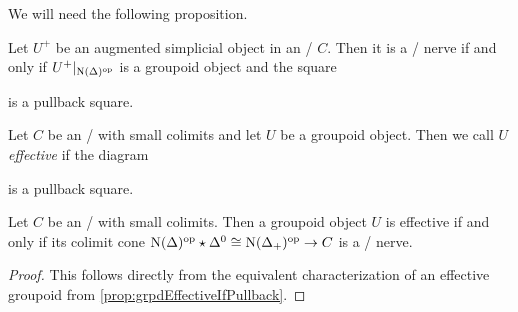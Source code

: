 We will need the following proposition.
\begin{prop}\label{prop:grpdEffectiveIfPullback} %
    Let $U^+$ be an augmented simplicial object in an \inftycat/ $C$.
    Then it is a \Cech/ nerve if and only if $U^+|_{\operatorname{N}(\Delta)^{\operatorname{op}}}$ is a groupoid object and the square
    \begin{center}
    \end{center}
    is a pullback square.
\end{prop}
\begin{definition}
    Let $C$ be an \inftycat/ with small colimits and let $U$ be a groupoid object.
    Then we call $U$ \emph{effective} if the diagram 
    \begin{center}
    \end{center}
    is a pullback square.
\end{definition}
\begin{corollary}\label{cor:groupoidEffectiveIffColimCechNerve}
    Let $C$ be an \inftycat/ with small colimits. 
    Then a groupoid object $U$ is effective if and only if its colimit cone $\operatorname{N}(\Delta)^{\operatorname{op}}\star\Delta^0\cong\operatorname{N}(\Delta_+)^{\operatorname{op}}\to C$ is a \Cech/ nerve.
    \begin{proof}
        This follows directly from the equivalent characterization of an effective groupoid from \cref{prop:grpdEffectiveIfPullback}.
    \end{proof}
\end{corollary}
